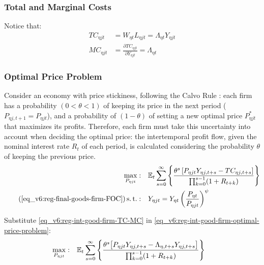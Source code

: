 \documentclass[../thesis.tex]{subfiles}
\begin{document}
\subsubsection*{Total and Marginal Costs}

Notice that:
\begin{align}
	TC_{\eta jt} &= W_{\eta t} L_{\eta jt} = \Lambda_{\eta t} Y_{\eta jt} \label{eq_v6:reg-int-good-firm-TC-MC} \\
	MC_{\eta jt} &= \frac{\partial TC_{\eta jt}}{\partial Y_{\eta jt}} = \Lambda_{\eta t} \nonumber
\end{align}



\subsubsection*{Optimal Price Problem}

Consider an economy with price stickiness, following the Calvo Rule \cite{calvo_staggered_1983}: each firm has a probability $(0 < \theta < 1)$ of keeping its price in the next period ($P_{\eta j,t+1} = P_{\eta jt}$), and a probability of $(1 - \theta)$ of setting a new optimal price $P_{\eta jt}^{\ast}$ that maximizes its profits. Therefore, each firm must take this uncertainty into account when deciding the optimal price: the intertemporal profit flow, given the nominal interest rate $R_{t}$ of each period, is calculated considering the probability $\theta$ of keeping the previous price. 
\begin{align}
	\label{eq_v6:reg-int-good-firm-optimal-price-problem}
	\max_{P_{\eta jt}}: & \quad \E \sum_{s=0}^{\infty} \left\{ \frac{ \theta^s \left[ P_{\eta jt} Y_{\eta j,t+s} - TC_{\eta j,t+s} \right]}{\prod_{k=0}^{s-1}(1+R_{t+k})} \right\} \\
	\tag{\ref{eq_v6:reg-final-goods-firm-FOC}}
	\st: & \quad Y_{\eta jt} = Y_{\eta t} \left( \frac{P_{\eta t}}{P_{\eta jt}} \right)^{\psi}
\end{align}


Substitute \ref{eq_v6:reg-int-good-firm-TC-MC} in \ref{eq_v6:reg-int-good-firm-optimal-price-problem}:
\begin{align}
	\label{eq_v6:reg-int-good-firm-optimal-price-problem-2}
	\max_{P_{\eta jt}}: & \quad {\mathbb{E}_{t}} \sum_{s=0}^{\infty} \left\{ \frac{\theta^s \big[ P_{\eta jt} Y_{\eta j,t+s} - \Lambda_{\eta, t+s} Y_{\eta j,t+s} \big]}{\prod_{k=0}^{s-1}(1+R_{t+k})} \right\}
\end{align}
\end{document}
